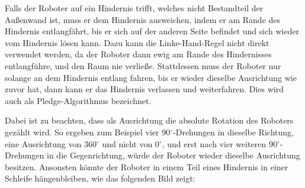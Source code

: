 \documentclass[10pt,a4paper]{article}
\begin{document}
\begin{center}
\end{center}

Falls der Roboter auf ein Hindernis trifft, welches nicht Bestandteil der Außenwand ist, muss er dem Hindernis ausweichen, indem er am Rande des Hindernis entlangfährt, bis er sich auf der anderen Seite befindet und sich wieder vom Hindernis lösen kann. %
Dazu kann  die Linke-Hand-Regel nicht direkt verwendet werden, da der Roboter dann ewig am Rande des Hindernisses entlangführe, und den Raum nie verließe. Stattdessen muss der Roboter nur solange an dem Hindernis entlang fahren, bis er wieder dieselbe Ausrichtung wie zuvor hat, dann kann er das Hindernis verlassen und %
weiterfahren. Dies wird auch als Pledge-Algorithmus bezeichnet.

Dabei ist zu beachten, dass als Ausrichtung die absolute Rotation des Roboters gezählt wird. So ergeben zum Beispiel vier 90$^\circ$-Drehungen in dieselbe Richtung, eine Ausrichtung von 360$^\circ$ und nicht von 0$^\circ$, und erst nach vier weiteren 90$^\circ$-Drehungen in die Gegenrichtung, würde der Roboter wieder dieselbe Ausrichtung besitzen. Ansonsten könnte der Roboter in einem Teil eines Hindernis in einer Schleife hängenbleiben, wie das folgenden Bild zeigt:
 
\end{document}
